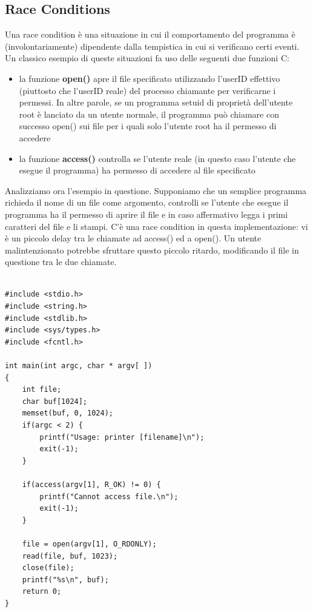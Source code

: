 \subsection{Race Conditions}
Una race condition è una situazione in cui il comportamento del programma è (involontariamente) dipendente dalla tempistica in cui si verificano certi eventi. Un classico esempio di queste situazioni fa uso delle seguenti due funzioni C:
\begin{itemize}
  \item la funzione \textbf{open()} apre il file specificato utilizzando l'userID effettivo (piuttosto che l'userID reale) del processo chiamante per verificarne i permessi. In altre parole, se un programma setuid di proprietà dell'utente root è lanciato da un utente normale, il programma può chiamare con successo open() sui file per i quali solo l'utente root ha il permesso di accedere
  \item la funzione \textbf{access()} controlla se l'utente reale (in questo caso l'utente che esegue il programma) ha permesso di accedere al file specificato
\end{itemize}
Analizziamo ora l'esempio in questione. Supponiamo che un semplice programma richieda il nome di un file come argomento, controlli se l'utente che esegue il programma ha il permesso di aprire il file e in caso affermativo legga i primi caratteri del file e li stampi. C'è una race condition in questa implementazione:  vi è un piccolo delay tra le chiamate ad access() ed a open(). Un utente malintenzionato potrebbe sfruttare questo piccolo ritardo, modificando il file in questione tra le due chiamate.
\begin{algorithm}
\begin{lstlisting}[caption={Esempio codice vulnerabile a race conditions}]

#include <stdio.h>
#include <string.h>
#include <stdlib.h>
#include <sys/types.h>
#include <fcntl.h>

int main(int argc, char * argv[ ])
{
	int file;
	char buf[1024];
	memset(buf, 0, 1024);
	if(argc < 2) {
		printf("Usage: printer [filename]\n");
		exit(-1);
	}
	
	if(access(argv[1], R_OK) != 0) {
		printf("Cannot access file.\n");
		exit(-1);
	}
	
	file = open(argv[1], O_RDONLY);
	read(file, buf, 1023);
	close(file);
	printf("%s\n", buf);
	return 0;
}

\end{lstlisting}
\end{algorithm}

